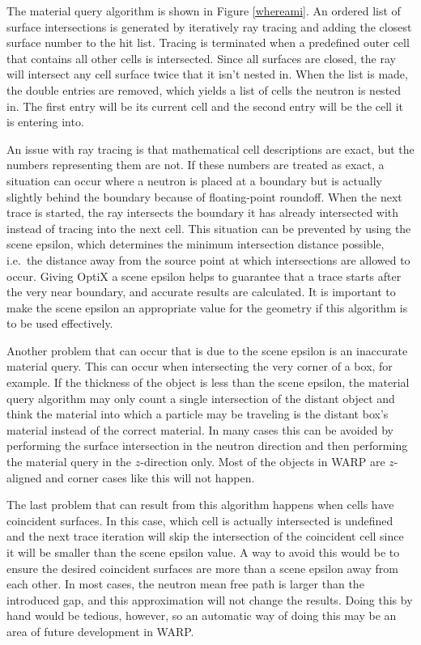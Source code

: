 The material query algorithm is shown in Figure \ref{whereami}.  An ordered list of surface intersections is generated by iteratively ray tracing and adding the closest surface number to the hit list.  Tracing is terminated when a predefined outer cell that contains all other cells is intersected.  Since all surfaces are closed, the ray will intersect any cell surface twice that it isn't nested in.  When the list is made, the double entries are removed, which yields a list of cells the neutron is nested in.  The first entry will be its current cell and the second entry will be the cell it is entering into.  

An issue with ray tracing is that mathematical cell descriptions are exact, but the numbers representing them are not. If these numbers are treated as exact, a situation can occur where a neutron is placed at a boundary but is actually slightly behind the boundary because of floating-point roundoff.  When the next trace is started, the ray intersects the boundary it has already intersected with instead of tracing into the next cell.  This situation can be prevented by using the scene epsilon, which determines the minimum intersection distance possible, i.e.\ the distance away from the source point at which intersections are allowed to occur.  Giving OptiX a scene epsilon helps to guarantee that a trace starts after the very near boundary, and accurate results are calculated.  It is important to make the scene epsilon an appropriate value for the geometry if this algorithm is to be used effectively. 

Another problem that can occur that is due to the scene epsilon is an inaccurate material query.  This can occur when intersecting the very corner of a box, for example. If the thickness of the object is less than the scene epsilon, the material query algorithm may only count a single intersection of the distant object and think the material into which a particle may be traveling is the distant box's material instead of the correct material.  In many cases this can be avoided by performing the surface intersection in the neutron direction and then performing the material query in the $z$-direction only.  Most of the objects in WARP are $z$-aligned and corner cases like this will not happen.%

The last problem that can result from this algorithm happens when cells have coincident surfaces.  In this case, which cell is actually intersected is undefined and the next trace iteration will skip the intersection of the coincident cell since it will be smaller than the scene epsilon value.  A way to avoid this would be to ensure the desired coincident surfaces are more than a scene epsilon away from each other.  In most cases, the neutron mean free path is larger than the introduced gap, and this approximation will not change the results. %
 Doing this by hand would be tedious, however, so an automatic way of doing this may be an area of future development in WARP.

